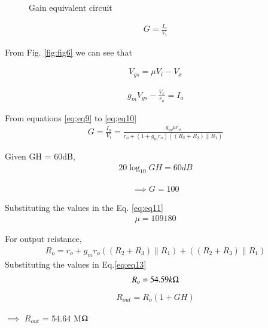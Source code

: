 \begin{enumerate}[label=\arabic*.,ref=\theenumi]
\begin{figure}[!ht]
	\begin{center}
		\resizebox{\columnwidth}{!}{}
	\end{center}
\caption{Gain equivalent circuit}
\label{fig:fig7}
\end{figure}


\begin{align}
    G = \frac{I_o}{V_i} 
    \label{eq;eq8}
\end{align}

From Fig. \ref{fig:fig6} we can see that
 
\begin{align}
    V_{gs} = \mu V_i - V_x
    \label{eq;eq9}
\end{align}

\begin{align}
    g_mV_{gs} - \frac{V_x}{r_o} = I_o
    \label{eq;eq10}
\end{align}

From equations \ref{eq;eq9} to \ref{eq;eq10}
\begin{align}
    G = \frac{I_o}{V_i} = \frac{g_m \mu r_o}{r_o + (1+g_m r_o)((R_2+R_3)\|R_1) }
    \label{eq:eq11}
\end{align}


Given GH = 60dB,
\begin{align}
    20\log_{10} GH = 60 dB
    \label{eq:eq12}
\end{align}

\begin{align}
\implies G=100
\end{align}

Substituting the values in the Eq. \ref{eq:eq11}
\begin{align}
    \mu = 109180
\end{align}


For output reistance,
\begin{align}
    R_o = r_o + g_m r_o((R_2+R_3)\|R_1) + ((R_2+R_3)\|R_1)    
    \label{eq:eq13}
\end{align}
Substituting the values in Eq.\ref{eq:eq13} 
\begin{align}
    R_o=54.59k\ohm
\end{align}
\begin{align}
R_{out} = R_o(1+GH)    
\end{align}

$\implies$  $R_{out}$ = 54.64 M$\ohm$


\begin{table}[!ht]
\centering

\caption{}
\label{table: Output_Table}
\end{table}
 

\end{enumerate}

